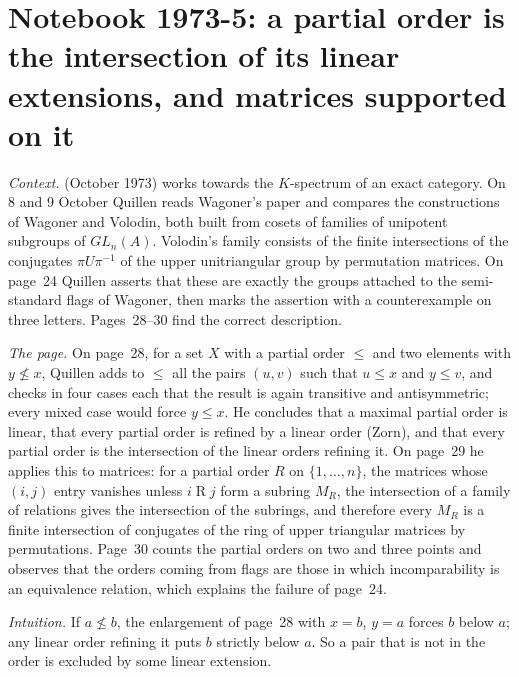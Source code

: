 \section[Notebook 1973-5: a partial order is the intersection of its linear extensions]{Notebook 1973-5: a partial order is the intersection of its linear extensions, and matrices supported on it\protect{}}\label{sec:quillen-1973-5}

\emph{Context.}  (October 1973) works towards the $K$-spectrum of an exact category. On 8 and 9 October Quillen reads Wagoner's paper and compares the constructions of Wagoner and Volodin, both built from cosets of families of unipotent subgroups of $GL_n(A)$. Volodin's family consists of the finite intersections of the conjugates $\pi U \pi^{-1}$ of the upper unitriangular group by permutation matrices. On page~24 Quillen asserts that these are exactly the groups attached to the semi-standard flags of Wagoner, then marks the assertion  with a counterexample on three letters. Pages~28--30 find the correct description.

\emph{The page.} On page~28, for a set $X$ with a partial order $\le$ and two elements with $y \not\le x$, Quillen adds to $\le$ all the pairs $(u, v)$ such that $u \le x$ and $y \le v$, and checks in four cases each that the result is again transitive and antisymmetric; every mixed case would force $y \le x$. He concludes that a maximal partial order is linear, that every partial order is refined by a linear order (Zorn), and that every partial order is the intersection of the linear orders refining it. On page~29 he applies this to matrices: for a partial order $R$ on $\{1, \ldots, n\}$, the matrices whose $(i, j)$ entry vanishes unless $i \mathrel{R} j$ form a subring $M_R$, the intersection of a family of relations gives the intersection of the subrings, and therefore every $M_R$ is a finite intersection of conjugates of the ring of upper triangular matrices by permutations. Page~30 counts the partial orders on two and three points and observes that the orders coming from flags are those in which incomparability is an equivalence relation, which explains the failure of page~24.

\emph{Intuition.} If $a \not\le b$, the enlargement of page~28 with $x = b$, $y = a$ forces $b$ below $a$; any linear order refining it puts $b$ strictly below $a$. So a pair that is not in the order is excluded by some linear extension.


